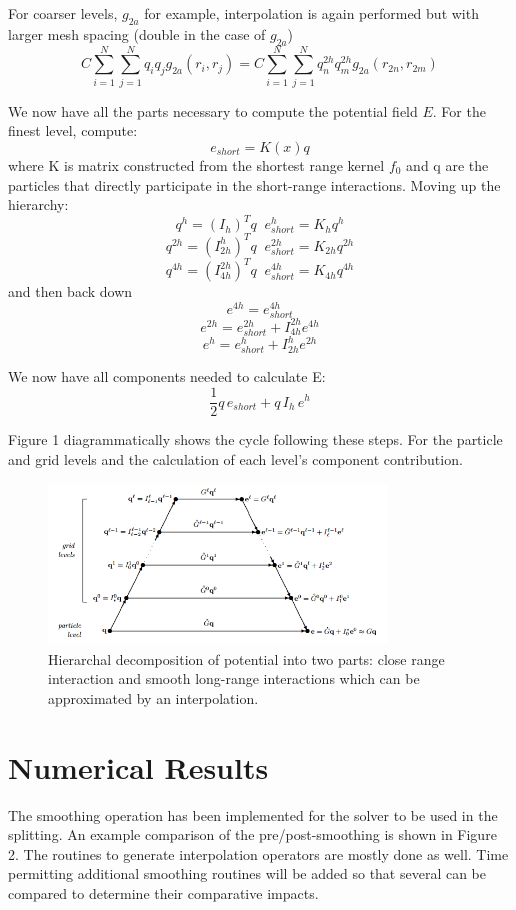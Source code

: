 \documentclass[review]{siamart}
\newcommand{\be}{\begin{equation}}
\newcommand{\ee}{\end{equation}}
\begin{document}
For coarser levels, $g_{2a}$ for example, interpolation is again performed but with larger mesh spacing (double in the case of $g_{2a}$)
\be C \sum_{i=1}^N \sum_{j=1}^N q_i q_j g_{2a}(r_i,r_j)  = C \sum_{i=1}^N \sum_{j=1}^N q_n^{2h} q_m^{2h} g_{2a}(r_{2n},r_{2m}) \ee

We now have all the parts necessary to compute the potential field $E$. For the finest level, compute:
\be e_{short} =K(x)q \ee
where K is matrix constructed from the shortest range kernel $f_0$ and q are the particles that directly participate in the short-range interactions. Moving up the hierarchy:
\be q^h = (I_h)^T q \;\; e^h_{short} = K_hq^h \ee
\be q^{2h} = (I_{2h}^h)^T q \;\; e^{2h}_{short} = K_{2h}q^{2h} \ee
\be q^{4h} = (I_{4h}^{2h})^T q \;\; e^{4h}_{short} = K_{4h}q^{4h} \ee
and then back down
\be e^{4h} = e^{4h}_{short} \ee
\be e^{2h} = e^{2h}_{short} + I^{2h}_{4h}e^{4h} \ee
\be e^{h} = e^{h}_{short}+I^h_{2h}e^{2h} \ee

We now have all components needed to calculate E:
\be \frac{1}{2}q\, e_{short} + q \, I_h \, e^h \ee

Figure 1 diagrammatically shows the cycle following these steps. For the particle and grid levels and the calculation of each level's component contribution.

\begin{figure}[!htb]
\centering
\includegraphics[width=0.8\textwidth]{levels.PNG}
\caption{Hierarchal decomposition of potential into two parts: close range interaction and smooth long-range interactions which can be approximated by an interpolation.\cite{3}}
\end{figure}

\section{Numerical Results}\label{sec:num}
The smoothing operation has been implemented for the solver to be used in the splitting. An example comparison of the pre/post-smoothing is shown in Figure 2. The routines to generate interpolation operators are mostly done as well. Time permitting additional smoothing routines will be added so that several can be compared to determine their comparative impacts.
\end{document}
